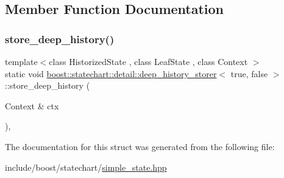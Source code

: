 \subsection{Member Function Documentation}
\mbox{\label{structboost_1_1statechart_1_1detail_1_1deep__history__storer_3_01true_00_01false_01_4_ab0a166bceb5d1f1062c9be06d8a9121b}} 
\subsubsection{\texorpdfstring{store\+\_\+deep\+\_\+history()}{store\_deep\_history()}}
{\footnotesize\ttfamily template$<$class Historized\+State , class Leaf\+State , class Context $>$ \\
static void \mbox{\hyperlink{structboost_1_1statechart_1_1detail_1_1deep__history__storer}{boost\+::statechart\+::detail\+::deep\+\_\+history\+\_\+storer}}$<$ true, false $>$\+::store\+\_\+deep\+\_\+history (\begin{DoxyParamCaption}\item[{Context \&}]{ctx }\end{DoxyParamCaption})\hspace{0.3cm}{\ttfamily [inline]}, {\ttfamily [static]}}



The documentation for this struct was generated from the following file\+:\begin{DoxyCompactItemize}
\item 
include/boost/statechart/\mbox{\hyperlink{simple__state_8hpp}{simple\+\_\+state.\+hpp}}\end{DoxyCompactItemize}

